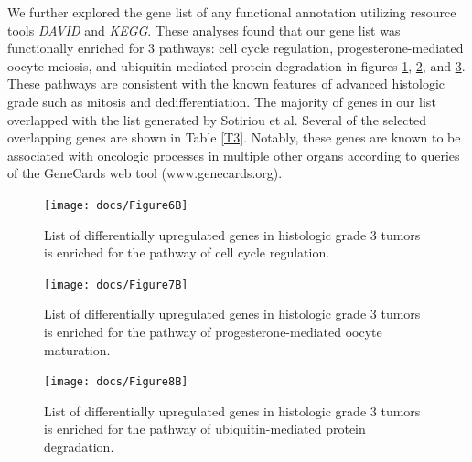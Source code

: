\documentclass[a4paper,10pt]{article}
\begin{document}
We further explored the gene list of any functional annotation utilizing resource tools 
\emph{DAVID} and \emph{KEGG}\cite{Huang1}\cite{Kanehisa1}\cite{Kanehisa2}\cite{Ogata1}.  These analyses found that our gene list 
was functionally enriched for 3 pathways: cell cycle regulation, progesterone-mediated 
oocyte meiosis, and ubiquitin-mediated protein degradation in figures \ref{6B}, \ref{7B}, and \ref{8B}. 
 These pathways are consistent with the known features of advanced histologic 
grade such as mitosis and dedifferentiation.  The majority of genes in our list
 overlapped with the list generated by Sotiriou et al. Several of the selected 
overlapping genes are shown in Table \ref{T3}.  Notably, these genes are known to 
be associated with oncologic processes in multiple other organs according to 
queries of the GeneCards web tool (www.genecards.org).  


 \begin{figure}
\centering
\texttt{[image: docs/Figure6B]}
\caption{List of differentially upregulated genes in histologic 
grade 3 tumors is enriched for the pathway of cell cycle regulation.}\label{6B}
\end{figure}


 \begin{figure}
\centering
\texttt{[image: docs/Figure7B]}
\caption{ List of differentially upregulated genes in 
histologic grade 3 tumors is enriched for the pathway 
of progesterone-mediated oocyte maturation.}\label{7B}
\end{figure}

 \begin{figure}
\centering
\texttt{[image: docs/Figure8B]}
\caption{ List of differentially upregulated genes in histologic grade 
3 tumors is enriched for the pathway of ubiquitin-mediated protein 
degradation.}\label{8B}
\end{figure}
\end{document}

